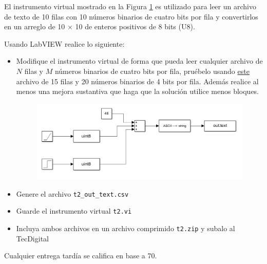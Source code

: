 \documentclass[12pt]{article}
\begin{document}
\setlength{\parindent}{0em}

El instrumento virtual mostrado en la Figura \ref{fig:for} es utilizado para leer un archivo de texto de 10 filas con 10 números binarios de cuatro bits por fila y convertirlos en un arreglo de 10 $\times$ 10 de enteros positivos de 8 bits (U8).

Usando LabVIEW realice lo siguiente:

\begin{itemize}
    \item Modifique el instrumento virtual de forma que pueda leer cualquier archivo de $N$ filas y $M$ números binarios de cuatro bits por fila, pruébelo usando \href{https://estudianteccr-my.sharepoint.com/:t:/g/personal/prof_juan_rojas_estudiantec_cr/EWLG3s0M7z9Gko9Haiys4CMBQu678gMBLzkhAnj8cZglHQ?e=ke8ZPG}{este} archivo de 15 filas y 20 números binarios de 4 bits por fila. Además realice al menos una mejora sustantiva que haga que la solución utilice menos bloques.
    \begin{figure}[H]
        \centering
        \includegraphics[width=15cm]{fig/t2.1.png}
        \caption{}
        \label{fig:for}
    \end{figure}
    \item Genere el archivo \verb+t2_out_text.csv+
    \item Guarde el instrumento virtual \verb+t2.vi+
    \item Incluya ambos archivos en un archivo comprimido \verb+t2.zip+ y subalo al TecDigital
\end{itemize}

Cualquier entrega tardía se califica en base a 70. 


% 
% 
\end{document}
